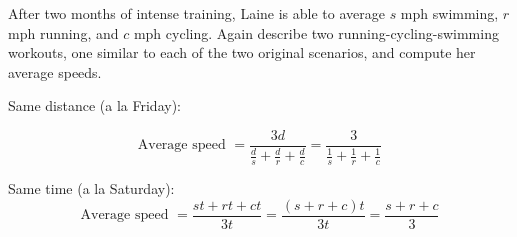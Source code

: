 \begin{prob}
After two months of intense training, Laine is able to average $s$ mph swimming, $r$ mph running, and $c$ mph cycling.  Again describe two running-cycling-swimming workouts, one similar to each of the two original scenarios, and compute her average speeds.     
\end{prob}

\begin{teachingnote}
Same distance (a la Friday):  

$$\text{Average speed } = \frac{3d}{\frac{d}{s}+\frac{d}{r}+\frac{d}{c}}=\frac{3}{\frac{1}{s}+\frac{1}{r}+\frac{1}{c}}$$

Same time (a la Saturday):  $$\text{Average speed } = \frac{st+rt+ct}{3t}=\frac{(s+r+c)t}{3t}=\frac{s+r+c}{3}$$
\end{teachingnote}
